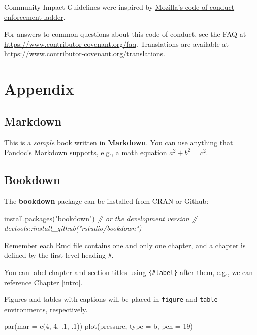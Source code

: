 \documentclass[
  fontsize=13pt,
  english,
  a4paper,
  openany, a4paper, oneside]{book}
\newenvironment{Shaded}{\begin{snugshade}}{\end{snugshade}}
\newcommand{\AttributeTok}[1]{\textcolor[rgb]{0.77,0.63,0.00}{#1}}
\newcommand{\CommentTok}[1]{\textcolor[rgb]{0.56,0.35,0.01}{\textit{#1}}}
\newcommand{\DecValTok}[1]{\textcolor[rgb]{0.00,0.00,0.81}{#1}}
\newcommand{\FunctionTok}[1]{\textcolor[rgb]{0.00,0.00,0.00}{#1}}
\newcommand{\NormalTok}[1]{#1}
\newcommand{\StringTok}[1]{\textcolor[rgb]{0.31,0.60,0.02}{#1}}
\begin{document}
Community Impact Guidelines were inspired by
\href{https://github.com/mozilla/diversity}{Mozilla's code of conduct enforcement ladder}.

For answers to common questions about this code of conduct, see the FAQ at
\url{https://www.contributor-covenant.org/faq}. Translations are available
at \url{https://www.contributor-covenant.org/translations}.

\hypertarget{appendix}{%
\chapter{Appendix}\label{appendix}}

\hypertarget{markdown-1}{%
\section{Markdown}\label{markdown-1}}

This is a \emph{sample} book written in \textbf{Markdown}. You can use anything that Pandoc's Markdown supports, e.g., a math equation \(a^2 + b^2 = c^2\).

\hypertarget{bookdown}{%
\section{Bookdown}\label{bookdown}}

The \textbf{bookdown} package can be installed from CRAN or Github:

\begin{Shaded}
\begin{Highlighting}[]
\FunctionTok{install.packages}\NormalTok{(}\StringTok{"bookdown"}\NormalTok{)}
\CommentTok{\# or the development version}
\CommentTok{\# devtools::install\_github("rstudio/bookdown")}
\end{Highlighting}
\end{Shaded}

Remember each Rmd file contains one and only one chapter, and a chapter is defined by the first-level heading \texttt{\#}.

You can label chapter and section titles using \texttt{\{\#label\}} after them, e.g., we can reference Chapter \ref{intro}.

Figures and tables with captions will be placed in \texttt{figure} and \texttt{table} environments, respectively.

\begin{Shaded}
\begin{Highlighting}[]
\FunctionTok{par}\NormalTok{(}\AttributeTok{mar =} \FunctionTok{c}\NormalTok{(}\DecValTok{4}\NormalTok{, }\DecValTok{4}\NormalTok{, .}\DecValTok{1}\NormalTok{, .}\DecValTok{1}\NormalTok{))}
\FunctionTok{plot}\NormalTok{(pressure, }\AttributeTok{type =} \StringTok{\textquotesingle{}b\textquotesingle{}}\NormalTok{, }\AttributeTok{pch =} \DecValTok{19}\NormalTok{)}
\end{Highlighting}
\end{Shaded}
\end{document}
